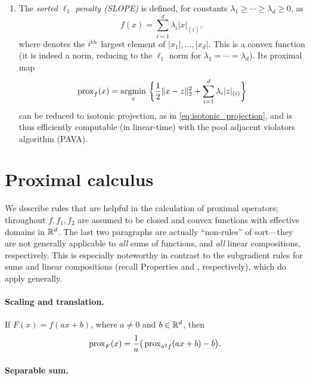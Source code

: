 \begin{Example}
\begin{enumerate}[label=\alph*., ref=\alph*]
\item {}
  The \emph{sorted $\ell_1$ penalty (SLOPE)} is defined, for constants
  $\lambda_1 \geq \cdots \geq \lambda_d \geq 0$, as 
  \begin{equation}
  \label{eq:slope}
  f(x) = \sum_{i=1}^d \lambda_i |x|_{(i)},
  \end{equation}
  where  denotes the $i^{\textnormal{th}}$ largest element of $|x_1|,
  \dots, |x_d|$. This is a convex function (it is indeed a norm, reducing to
  the $\ell_1$ norm for $\lambda_1 = \cdots = \lambda_d$). Its proximal map   
  \[
  \operatorname{prox}_f(x) = \operatorname*{argmin}_z \, \bigg\{ \frac{1}{2} \|x - z\|_2^2 + \sum_{i=1}^d
  \lambda_i |z|_{(i)} \bigg\} 
  \]
  can be reduced to isotonic projection, as in \eqref{eq:isotonic_projection},
  and is thus efficiently computable (in linear-time) with the pool adjacent
  violators algorithm (PAVA). 
\end{enumerate}
\end{Example}

\section{Proximal calculus}

We describe rules that are helpful in the calculation of proximal operators; 
throughout $f,f_1,f_2$ are assumed to be closed and convex functions with
effective domains in $\mathbb{R}^d$. The last two paragraphs are actually ``non-rules''
of sort---they are not generally applicable to \emph{all} sums of functions, 
and \emph{all} linear compositions, respectively. This is especially noteworthy
in contrast to the subgradient rules for sums and linear compositions (recall
Properties  and , 
respectively), which do apply generally. 

\paragraph{Scaling and translation.}

If $F(x) = f(ax + b)$, where $a \not= 0$ and $b \in \mathbb{R}^d$, then 
\[ 
\operatorname{prox}_F(x) = \frac{1}{a} \big( \operatorname{prox}_{a^2 f}(ax + b) - b \big).
\]

\paragraph{Separable sum.}

